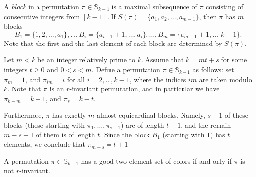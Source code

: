 \documentclass[10pt,a4paper]{amsart}
\begin{document}
\begin{rem}\label{R:blocksinpi} A \textit{block} in a
permutation $\pi\in\mathbb{S}_{k-1}$
is a maximal subsequence of $\pi$ consisting of consecutive
integers from $[k-1]$. If $S(\pi)=\{a_1,a_2,\ldots,a_{m-1}\}$,
then
 $\pi$ has $m$ blocks
$$B_1=\{1,2,\ldots,a_1\},\ldots,
B_{i}=\{a_{i-1}+1 ,\ldots,a_i\},\ldots, B_{m}=\{a_{m-1}+1
,\ldots,k-1\}.$$ Note that the first and the last element of each
block are determined by $S(\pi)$.
\end{rem}

\begin{rem}\label{R:Blocks}
\label{P:blocksinr-invariant} Let $m<k$ be an integer relatively
prime to $k$. Assume that $k=mt+s$ for some integers $t \geq 0$
and $0<s<m$. Define a permutation $\pi \in \mathbb{S}_{k-1}$ as
follows: set $\pi_m=1$, and $\pi_{im}=i$ for all $i = 2, \ldots, k
- 1$, where the indices $im$ are taken modulo $k$. Note that $\pi$
is an $r$-invariant permutation, and in particular we have
$\pi_{k-m}=k-1$, and $\pi_s=k-t$.

Furthermore, $\pi$ has exactly $m$ almost equicardinal blocks.
Namely, $s-1$ of these blocks (those starting with
$\pi_1,\ldots,\pi_{s-1}$) are of length $t+1$, and the remain
$m-s+1$ of them is of length $t$. Since the block $B_1$ (starting
with $1$) has $t$ elements, we conclude that $\pi_{m-s}=t+1$
\end{rem}

\begin{thm}\label{T:imadvadobra} A permutation
$\pi\in \mathbb{S}_{k-1}$ has a good two-element set of colors if
and only if $\pi$ is not $r$-invariant.
\end{thm}
\end{document}
